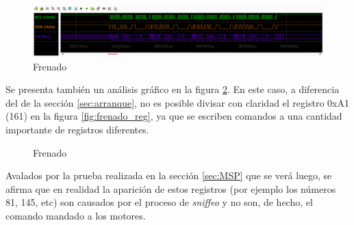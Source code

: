 \documentclass[main]{subfiles}
\begin{document}
\begin{figure}[h!]
	\centering
	\includegraphics[width=1\textwidth]{./pics_sniffer/snif_frenado.png}
	\caption{Frenado}
	\label{fig:snif_frenado}
\end{figure}

Se presenta también un análisis gráfico en la figura \ref{fig:frenado}. En este caso, a diferencia del de la sección \ref{sec:arranque}, no es posible divisar con claridad el registro 0xA1 (161) en la figura \ref{fig:frenado_reg}, ya que se escriben comandos a una cantidad importante de registros diferentes.\\

\begin{figure} [h!]
\centering
  \caption{Frenado}
  \label{fig:frenado}
\end{figure}

Avalados por la prueba realizada en la sección \ref{sec:MSP} que se verá luego, se afirma que en realidad la aparición de estos registros (por ejemplo los números 81, 145, etc) son causados por el proceso de \emph{sniffeo} y no son, de hecho, el comando mandado a los motores.\\
\end{document}
